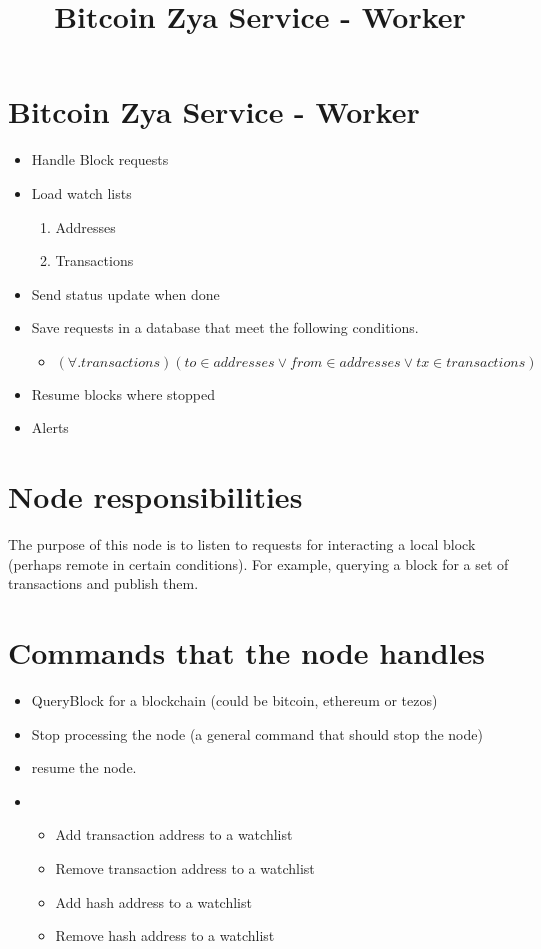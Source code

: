 \documentclass[11pt, twoside, a4paper]{article}
\begin{document}
\title{Bitcoin Zya Service - Worker}
\section {Bitcoin Zya Service - Worker}
\begin{itemize}
  \item Handle Block requests 
  \item Load watch lists 
    \begin{enumerate}
      \item Addresses
      \item Transactions 
    \end{enumerate}
  \item Send status update when done 
  \item Save requests in a database that meet the following conditions.
    \begin{itemize}
      \item
        $(\forall . transactions)
          (to \in addresses \lor from \in addresses \lor tx \in transactions)$
  \end{itemize}
  \item Resume blocks where stopped
  \item Alerts  
\end{itemize}
\section {Node responsibilities}
The purpose of this node is to listen to requests for interacting
a local block (perhaps remote in certain conditions). For example,
querying a block for a set of transactions and publish them.

\section {Commands that the node handles}
\begin {itemize}
  \item QueryBlock for a blockchain (could be bitcoin, ethereum or tezos)
  \item Stop processing the node (a general command that should stop the node)
  \item resume the node.
  \item 
    \begin {itemize}
      \item Add transaction address to a watchlist 
      \item Remove transaction address to a watchlist
      \item Add hash address to a watchlist 
      \item Remove hash address to a watchlist
    \end {itemize}
\end {itemize}
\end{document}
